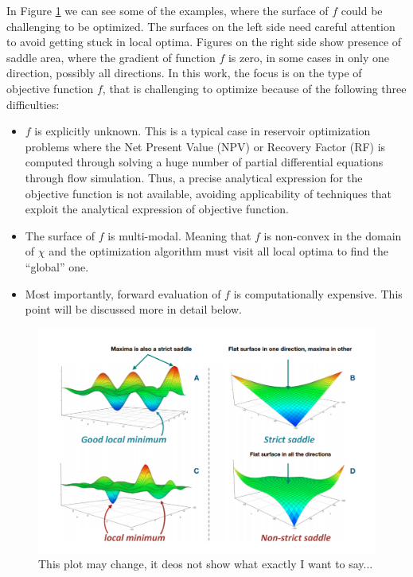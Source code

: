 \documentclass[]{elsarticle} %
\providecommand{\tightlist}{%
  \setlength{\itemsep}{0pt}\setlength{\parskip}{0pt}}
\begin{document}
In Figure \ref{fig:optglobal} we can see some of the examples, where the surface of \(f\) could be challenging to be optimized. The surfaces on the left side need careful attention to avoid getting stuck in local optima. Figures on the right side show presence of saddle area, where the gradient of function \(f\) is zero, in some cases in only one direction, possibly all directions. In this work, the focus is on the type of objective function \(f\), that is challenging to optimize because of the following three difficulties:

\begin{itemize}
\tightlist
\item
  \(f\) is explicitly unknown. This is a typical case in reservoir optimization problems where the Net Present Value (NPV) or Recovery Factor (RF) is computed through solving a huge number of partial differential equations through flow simulation. Thus, a precise analytical expression for the objective function is not available, avoiding applicability of techniques that exploit the analytical expression of objective function.
\item
  The surface of \(f\) is multi-modal. Meaning that \(f\) is non-convex in the domain of \(\chi\) and the optimization algorithm must visit all local optima to find the ``global'' one.
\item
  Most importantly, forward evaluation of \(f\) is computationally expensive. This point will be discussed more in detail below.
\end{itemize}

\begin{figure}

{\centering \includegraphics[width=0.7\linewidth]{img/globalopt} 

}

\caption{This plot may change, it deos not show what exactly I want to say...}\label{fig:optglobal}
\end{figure}
\end{document}
